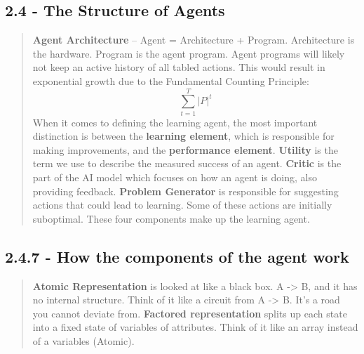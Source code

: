 \documentclass{article}
\begin{document}
\subsection{2.4 - The Structure of Agents}
\begin{quote}
    \textbf{Agent Architecture} – Agent = Architecture + Program. Architecture is the hardware. Program is the agent program. Agent programs will likely not keep an active history of all tabled actions. This would result in exponential growth due to the Fundamental Counting Principle:
    \[
        \sum_{t=1}^{T} |P|^t
    \]
    When it comes to defining the learning agent, the most important distinction is between the \textbf{learning element}, which is responsible for making improvements, and the \textbf{performance element}.
    \textbf{Utility} is the term we use to describe the measured success of an agent. \textbf{Critic} is the part of the AI model which focuses on how an agent is doing, also providing feedback.
    \textbf{Problem Generator} is responsible for suggesting actions that could lead to learning. Some of these actions are initially suboptimal. These four components make up the learning agent.
\end{quote}
\subsection{2.4.7 - How the components of the agent work}
\begin{quote}
    \textbf{Atomic Representation} is looked at like a black box. A -> B, and it has no internal structure. Think of it like a circuit from A -> B. It's a road you cannot deviate from.
    \textbf{Factored representation} splits up each state into a fixed state of variables of attributes. Think of it like an array instead of a variables (Atomic).
\end{quote}
\end{document}
